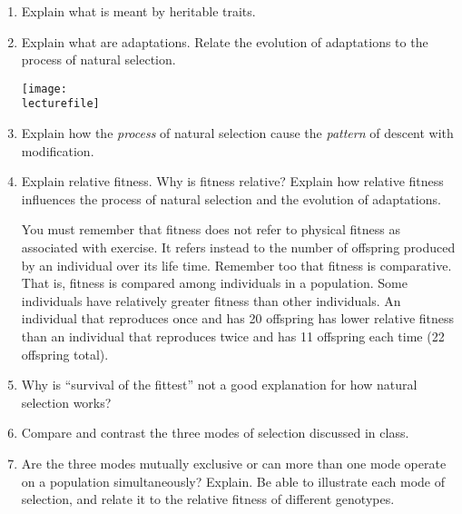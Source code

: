 \documentclass[letterpaper]{tufte-handout}
\newcommand\lecturefile{163_lecture05_fullsize}
\begin{document}
\begin{enumerate}
	\item Explain what is meant by heritable traits.%

	\item Explain what are adaptations. Relate the evolution of adaptations to the process of natural selection.
	\begin{marginfigure}
		\texttt{[image: \\lecturefile]}
	\end{marginfigure}
	
	\item Explain how the \emph{process} of natural selection cause the \emph{pattern} of descent with modification.

	\item Explain relative fitness. Why is fitness relative? Explain how relative fitness influences the process of natural selection and the evolution of adaptations.  
	
	You must remember that fitness does not refer to physical fitness as associated with exercise. It refers instead to the number of offspring produced by an individual over its life time. Remember too that fitness is comparative. That is, fitness is compared among individuals in a population. Some individuals have relatively greater fitness than other individuals. An individual that reproduces once and has 20 offspring has lower relative fitness than an individual that reproduces twice and has 11 offspring each time (22 offspring total).

	\item Why is ``survival of the fittest'' not a good explanation for how natural selection works?

	\item Compare and contrast the three modes of selection discussed in class.  
	
	\item  Are the three modes mutually exclusive or can more than one mode operate on a population simultaneously? Explain.  Be able to illustrate each mode of selection, and relate it to the relative fitness of different genotypes.  
	

\end{enumerate}
\end{document}
